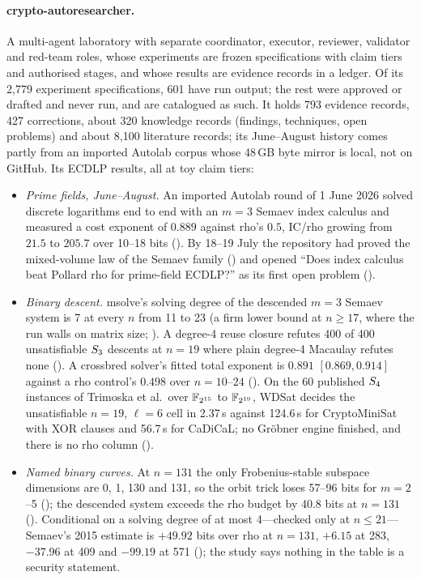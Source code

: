 \paragraph{crypto-autoresearcher.} A multi-agent laboratory with separate
coordinator, executor, reviewer, validator and red-team roles, whose
experiments are frozen specifications with claim tiers and authorised
stages, and whose results are evidence records in a ledger. Of its 2{,}779
experiment specifications, 601 have run output; the rest were approved or
drafted and never run, and are catalogued as such. It holds 793 evidence
records, 427 corrections, about 320 knowledge records (findings,
techniques, open problems) and about 8{,}100 literature records; its
June--August history comes partly from an imported Autolab corpus whose
48\,GB byte mirror is local, not on GitHub. Its ECDLP results, all at toy
claim tiers:
\begin{itemize}
\item \emph{Prime fields, June--August.} An imported Autolab round of
  1 June 2026 solved discrete logarithms end to end with an $m=3$ Semaev
  index calculus and measured a cost exponent of $0.889$ against rho's
  $0.5$, IC/rho growing from $21.5$ to $205.7$ over 10--18 bits
  (). By 18--19 July the
  repository had proved the mixed-volume law of the Semaev family
  () and opened ``Does index calculus beat
  Pollard rho for prime-field ECDLP?'' as its first open problem
  ().
\item \emph{Binary descent.} msolve's solving degree of the descended $m=3$
  Semaev system is 7 at every $n$ from 11 to 23 (a firm lower bound at
  $n\ge17$, where the run walls on matrix size;
  ). A degree-4 reuse closure
  refutes 400 of 400 unsatisfiable $S_{3}$ descents at $n=19$ where plain
  degree-4 Macaulay refutes none
  (). A crossbred solver's fitted
  total exponent is $0.891$ $[0.869,0.914]$ against a rho control's $0.498$
  over $n=10$--$24$ (). On the 60
  published $S_{4}$ instances of Trimoska et al.\ over $\mathbb{F}_{2^{15}}$ to
  $\mathbb{F}_{2^{19}}$, WDSat decides the unsatisfiable $n=19$, $\ell=6$ cell in
  2.37\,s against 124.6\,s for CryptoMiniSat with XOR clauses and 56.7\,s for
  CaDiCaL; no Gröbner engine finished, and there is no rho column
  ().
\item \emph{Named binary curves.} At $n=131$ the only Frobenius-stable
  subspace dimensions are 0, 1, 130 and 131, so the orbit trick loses
  57--96 bits for $m=2$--5 (); the
  descended system exceeds the rho budget by 40.8 bits at $n=131$
  (). Conditional on a solving degree
  of at most 4---checked only at $n\le21$---Semaev's 2015 estimate is
  $+49.92$ bits over rho at $n=131$, $+6.15$ at 283, $-37.96$ at 409 and
  $-99.19$ at 571 (); the
  study says nothing in the table is a security statement.
\end{itemize}
